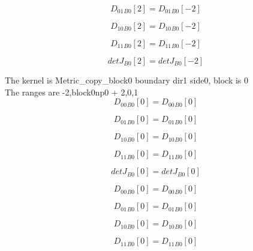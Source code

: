\documentclass{article}
\begin{document}
\begin{dmath}{D_{01}{_{B0}}}[{2}] = {D_{01}{_{B0}}}[{-2}]\end{dmath}

\begin{dmath}{D_{10}{_{B0}}}[{2}] = {D_{10}{_{B0}}}[{-2}]\end{dmath}

\begin{dmath}{D_{11}{_{B0}}}[{2}] = {D_{11}{_{B0}}}[{-2}]\end{dmath}

\begin{dmath}{detJ{_{B0}}}[{2}] = {detJ{_{B0}}}[{-2}]\end{dmath}

\noindent The kernel is Metric_copy_block0 boundary dir1 side0, block is 0\\\noindent The ranges are -2,block0np0 + 2,0,1\\\begin{dmath}{D_{00}{_{B0}}}[{0}] = {D_{00}{_{B0}}}[{0}]\end{dmath}

\begin{dmath}{D_{01}{_{B0}}}[{0}] = {D_{01}{_{B0}}}[{0}]\end{dmath}

\begin{dmath}{D_{10}{_{B0}}}[{0}] = {D_{10}{_{B0}}}[{0}]\end{dmath}

\begin{dmath}{D_{11}{_{B0}}}[{0}] = {D_{11}{_{B0}}}[{0}]\end{dmath}

\begin{dmath}{detJ{_{B0}}}[{0}] = {detJ{_{B0}}}[{0}]\end{dmath}

\begin{dmath}{D_{00}{_{B0}}}[{0}] = {D_{00}{_{B0}}}[{0}]\end{dmath}

\begin{dmath}{D_{01}{_{B0}}}[{0}] = {D_{01}{_{B0}}}[{0}]\end{dmath}

\begin{dmath}{D_{10}{_{B0}}}[{0}] = {D_{10}{_{B0}}}[{0}]\end{dmath}

\begin{dmath}{D_{11}{_{B0}}}[{0}] = {D_{11}{_{B0}}}[{0}]\end{dmath}
\end{document}
